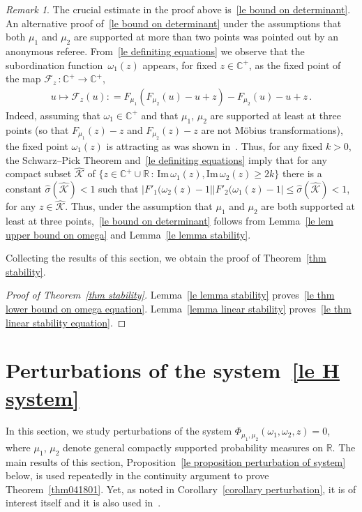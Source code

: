 \documentclass[10pt,reqno]{amsart}
\numberwithin{equation}{section}
\theoremstyle{plain}
\newcounter{kevin}
\numberwithin{kevin}{section}
\theoremstyle{remark}
\newtheorem{remark}[kevin]{Remark}
\newcommand{\im}{\mathrm{Im}\,}
\newcommand{\R}{{\mathbb R }}
\newcommand{\C}{{\mathbb C}}
\newcommand{\deq}{\mathrel{\mathop:}=}
\newcommand{\PP}{\Phi}
\begin{document}
\begin{remark}
 The crucial estimate in the proof above is~\eqref{le bound on determinant}. An alternative proof of~\eqref{le bound on determinant} under the assumptions that both $\mu_1$ and $\mu_2$ are supported at more than two points was pointed out by  
 an anonymous referee. From~\eqref{le definiting equations} we observe that the subordination function~$\omega_1(z)$ appears, for fixed $z\in\C^+$, as the fixed point of the map $\mathcal{F}_z\,:\C^+\rightarrow \C^+$,
 \begin{align}\label{the calF map}
  u\mapsto \mathcal{F}_z(u)\deq F_{\mu_1}(F_{\mu_2}(u)-u+z)-F_{\mu_2}(u)-u+z\,.
 \end{align}
  Indeed, assuming that $\omega_1\in\C^+$ and that $\mu_1$, $\mu_2$ are supported at least at three points (so that $F_{\mu_1}(z)-z$ and $F_{\mu_2}(z)-z$ are not M\"obius transformations), the fixed point $\omega_1(z)$ is attracting as was shown in~\cite{BB}. Thus, for any fixed $k>0$, the Schwarz--Pick Theorem and~\eqref{le definiting equations} imply that for any compact subset $\widehat{\mathcal{K}}$ of $\{z\in\C^+\cup\R\,:\, \im \omega_1(z),\im \omega_2(z)\ge 2k\}$ there is a constant $\widehat{\sigma}(\widehat{\mathcal{K}})<1$ such that $|F'_1(\omega_2(z)-1||F'_2(\omega_1(z)-1|\le \widehat{\sigma}(\widehat{\mathcal{K}})<1$, for any $z\in\widehat{ \mathcal{K}}$. Thus, under the assumption that $\mu_1$ and $\mu_2$ are both supported at least at three points,~\eqref{le bound on determinant} follows from Lemma~\ref{le lem upper bound on omega} and Lemma~\ref{le lemma stability}.
 
\end{remark}


Collecting the results of this section, we obtain the proof of Theorem~\ref{thm stability}.
\begin{proof}[Proof of Theorem~\ref{thm stability}]
Lemma~\ref{le lemma stability} proves~\eqref{le thm lower bound on omega equation}. Lemma~\ref{lemma linear stability} proves~\eqref{le thm linear stability equation}. 
\end{proof}






\section{Perturbations of the system~\eqref{le H system}}\label{section perturbation}
In this section, we study perturbations of the system $\PP_{\mu_1,\mu_2}(\omega_1,\omega_2,z)=0$, where $\mu_1$, $\mu_2$ denote general compactly supported probability measures on $\R$. The main results of this section, Proposition~\ref{le proposition perturbation of system} below, is used repeatedly in the continuity argument to prove Theorem~\ref{thm041801}. Yet, as noted in Corollary~\ref{corollary perturbation}, it is of interest itself and it is also used in~\cite{BES15-2}.
\end{document}
